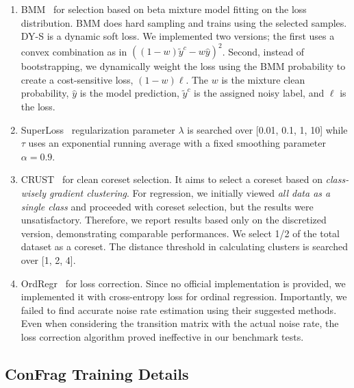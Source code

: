 \documentclass{article}
\theoremstyle{plain}
\theoremstyle{definition}
\theoremstyle{remark}
\begin{document}
\begin{enumerate}
\item BMM~\citep{arazo19} for selection based on beta mixture model fitting on the loss distribution. 
BMM does hard sampling and trains using the selected samples.
DY-S is a dynamic soft loss. We implemented two versions; the first uses a convex combination as in \citet{reed15} $((1-w)\tilde{y}^c - w\hat{y})^2$. Second, instead of bootstrapping, we dynamically weight the loss using the BMM probability to create a cost-sensitive loss, $(1-w)\ell$.
The $w$ is the mixture clean probability, $\hat{y}$ is the model prediction, $\tilde{y}^c$ is the assigned noisy label, and $\ell$ is the loss.

\item SuperLoss~\citep{castells20} regularization parameter $\lambda$ is searched over [0.01, 0.1, 1, 10] while $\tau$ uses an exponential running average with a fixed smoothing parameter $\alpha = 0.9$.

\item \text{[Incompatible]} CRUST~\citep{mirzasoleiman20crust} for clean coreset selection.
It aims to select a coreset based on \textit{class-wisely gradient clustering}.
For regression, we initially viewed \textit{all data as a single class} and proceeded with coreset selection, but the results were unsatisfactory.
Therefore, we report results based only on the discretized version, demonstrating comparable performances.
We select 1/2 of the total dataset as a coreset.
The distance threshold in calculating clusters is searched over [1, 2, 4].

\item \text{[Incompatible]} OrdRegr~\citep{garg2020robust} for loss correction.
Since no official implementation is provided, we implemented it with cross-entropy loss for ordinal regression.
Importantly, we failed to find accurate noise rate estimation using their suggested methods.
Even when considering the transition matrix with the actual noise rate, the loss correction algorithm proved ineffective in our benchmark tests.

\end{enumerate}

\subsection{ConFrag Training Details}\label{subsec:training_details}
\end{document}
